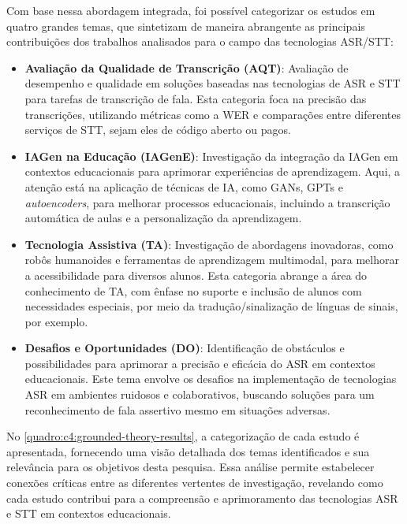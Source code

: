 Com base nessa abordagem integrada, foi possível categorizar os estudos em quatro grandes temas, que sintetizam de maneira abrangente as principais contribuições dos trabalhos analisados para o campo das tecnologias ASR/STT:

\begin{itemize}
\item \textbf{Avaliação da Qualidade de Transcrição (AQT)}: Avaliação de desempenho e qualidade em soluções baseadas nas tecnologias de ASR e STT para tarefas de transcrição de fala. Esta categoria foca na precisão das transcrições, utilizando métricas como a WER e comparações entre diferentes serviços de STT, sejam eles de código aberto ou pagos.

\item \textbf{IAGen na Educação (IAGenE)}: Investigação da integração da IAGen em contextos educacionais para aprimorar experiências de aprendizagem. Aqui, a atenção está na aplicação de técnicas de IA, como GANs, GPTs e \textit{autoencoders}, para melhorar processos educacionais, incluindo a transcrição automática de aulas e a personalização da aprendizagem.

\item \textbf{Tecnologia Assistiva (TA)}: Investigação de abordagens inovadoras, como robôs humanoides e ferramentas de aprendizagem multimodal, para melhorar a acessibilidade para diversos alunos. Esta categoria abrange a área do conhecimento de TA, com ênfase no suporte e inclusão de alunos com necessidades especiais, por meio da tradução/sinalização de línguas de sinais, por exemplo.

\item \textbf{Desafios e Oportunidades (DO)}: Identificação de obstáculos e possibilidades para aprimorar a precisão e eficácia do ASR em contextos educacionais. Este tema envolve os desafios na implementação de tecnologias ASR em ambientes ruidosos e colaborativos, buscando soluções para um reconhecimento de fala assertivo mesmo em situações adversas.
\end{itemize}

No \autoref{quadro:c4:grounded-theory-results}, a categorização de cada estudo é apresentada, fornecendo uma visão detalhada dos temas identificados e sua relevância para os objetivos desta pesquisa. Essa análise permite estabelecer conexões críticas entre as diferentes vertentes de investigação, revelando como cada estudo contribui para a compreensão e aprimoramento das tecnologias ASR e STT em contextos educacionais.

